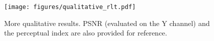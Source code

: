 \documentclass[runningheads]{llncs}
\begin{document}
\begin{figure}[htbp]
	\begin{center}
		\texttt{[image: figures/qualitative\_rlt.pdf]}
	\end{center}
	\vspace{-0.4cm}
	\caption{More qualitative results. PSNR (evaluated on the Y channel) and the 
		perceptual index are also provided for reference.}
	\label{fig:intro_cmp}
\end{figure}
\end{document}

